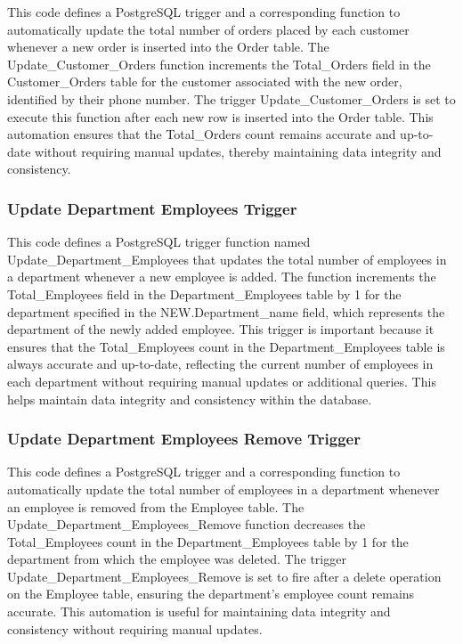 

This code defines a PostgreSQL trigger and a corresponding function to automatically update the total number of orders placed by each customer whenever a new order is inserted into the Order table. The Update\_Customer\_Orders function increments the Total\_Orders field in the Customer\_Orders table for the customer associated with the new order, identified by their phone number. The trigger Update\_Customer\_Orders is set to execute this function after each new row is inserted into the Order table. This automation ensures that the Total\_Orders count remains accurate and up-to-date without requiring manual updates, thereby maintaining data integrity and consistency.

\subsubsection{Update Department Employees Trigger}



This code defines a PostgreSQL trigger function named Update\_Department\_Employees that updates the total number of employees in a department whenever a new employee is added. The function increments the Total\_Employees field in the Department\_Employees table by 1 for the department specified in the NEW.Department\_name field, which represents the department of the newly added employee. This trigger is important because it ensures that the Total\_Employees count in the Department\_Employees table is always accurate and up-to-date, reflecting the current number of employees in each department without requiring manual updates or additional queries. This helps maintain data integrity and consistency within the database.

\subsubsection{Update Department Employees Remove Trigger}



This code defines a PostgreSQL trigger and a corresponding function to automatically update the total number of employees in a department whenever an employee is removed from the Employee table. The Update\_Department\_Employees\_Remove function decreases the Total\_Employees count in the Department\_Employees table by 1 for the department from which the employee was deleted. The trigger Update\_Department\_Employees\_Remove is set to fire after a delete operation on the Employee table, ensuring the department's employee count remains accurate. This automation is useful for maintaining data integrity and consistency without requiring manual updates.

